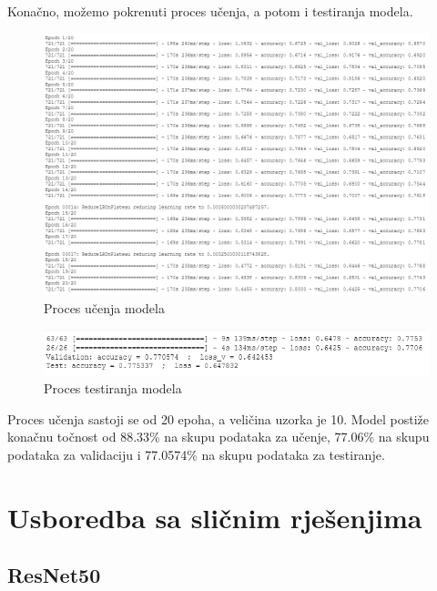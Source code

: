 \documentclass[times, utf8, zavrsni]{fer}
\begin{document}
Konačno, možemo pokrenuti proces učenja, a potom i testiranja modela.
%
\begin{figure}[!h]
\hspace{-0.1\textwidth}
\includegraphics[width=1.2\textwidth]{./slike/colab4}
\caption{Proces učenja modela}
\label{fig:colab4}
\end{figure}
%
\newpage
%
\begin{figure}[!h]
\hspace{-0.05\textwidth}
\includegraphics[width=1.1\textwidth]{./slike/colab5}
\caption{Proces testiranja modela}
\label{fig:colab5}
\end{figure}
%

Proces učenja sastoji se od 20 epoha, a veličina uzorka  je 10. Model postiže konačnu točnost od 88.33\% na skupu podataka za učenje, 77.06\% na skupu podataka za validaciju i 77.0574\% na skupu podataka za testiranje.
\newpage
\section{Usboredba sa sličnim rješenjima}

\subsection*{ResNet50}
\end{document}
